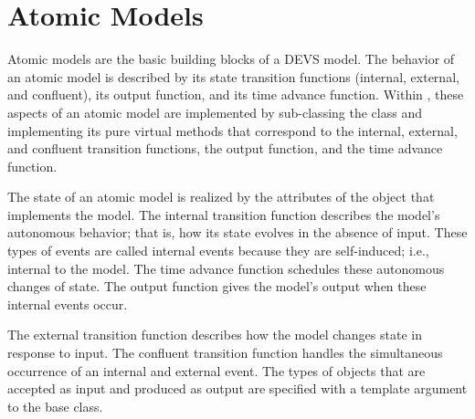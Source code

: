 \chapter{Atomic Models}
\label{section:atomic_models}
Atomic models are the basic building blocks of a DEVS model. The behavior of an atomic model is described by its state transition functions (internal, external, and confluent), its output function, and its time advance function. Within \adevs, these aspects of an atomic model are implemented by sub-classing the  class and implementing its pure virtual methods that correspond to the internal, external, and confluent transition functions, the output function, and the time advance function.

The state of an atomic model is realized by the attributes of the object that implements the model. The internal transition function describes the model's autonomous behavior; that is, how its state evolves in the absence of input. These types of events are called internal events because they are self-induced; i.e., internal to the model. The time advance function schedules these autonomous changes of state. The output function gives the model's output when these internal events occur.

The external transition function describes how the model changes state in response to input. The confluent transition function handles the simultaneous occurrence of an internal and external event. The types of objects that are accepted as input and produced as output are specified with a template argument to the  base class.

